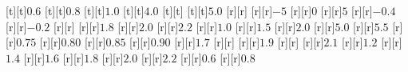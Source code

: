 \begin{psfrags}
[t][t]{$0.6$}%
[t][t]{$0.8$}%
[t][t]{$1.0$}%
[t][t]{$4.0$}%
[t][t]{}%
[t][t]{$5.0$}%
%
[r][r]{}%
[r][r]{$-5$}%
[r][r]{$0$}%
[r][r]{$5$}%
[r][r]{$-0.4$}%
[r][r]{$-0.2$}%
[r][r]{}%
[r][r]{$1.8$}%
[r][r]{$2.0$}%
[r][r]{$2.2$}%
[r][r]{$1.0$}%
[r][r]{$1.5$}%
[r][r]{$2.0$}%
[r][r]{$5.0$}%
[r][r]{$5.5$}%
[r][r]{$0.75$}%
[r][r]{$0.80$}%
[r][r]{$0.85$}%
[r][r]{$0.90$}%
[r][r]{$1.7$}%
[r][r]{}%
[r][r]{$1.9$}%
[r][r]{}%
[r][r]{$2.1$}%
[r][r]{$1.2$}%
[r][r]{$1.4$}%
[r][r]{$1.6$}%
[r][r]{$1.8$}%
[r][r]{$2.0$}%
[r][r]{$2.2$}%
[r][r]{$0.6$}%
[r][r]{$0.8$}%
%
%
\end{psfrags}%
%
